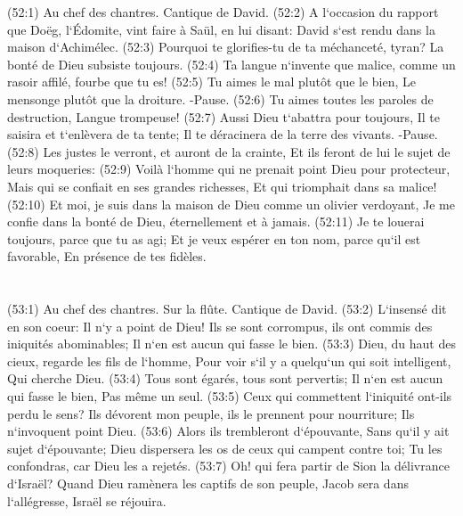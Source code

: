 \verse (52:1) Au chef des chantres. Cantique de David. (52:2) A l`occasion du rapport que Doëg, l`Édomite, vint faire à Saül, en lui disant: David s`est rendu dans la maison d`Achimélec. (52:3) Pourquoi te glorifies-tu de ta méchanceté, tyran? La bonté de Dieu subsiste toujours. 
\verse (52:4) Ta langue n`invente que malice, comme un rasoir affilé, fourbe que tu es! 
\verse (52:5) Tu aimes le mal plutôt que le bien, Le mensonge plutôt que la droiture. -Pause. 
\verse (52:6) Tu aimes toutes les paroles de destruction, Langue trompeuse! 
\verse (52:7) Aussi Dieu t`abattra pour toujours, Il te saisira et t`enlèvera de ta tente; Il te déracinera de la terre des vivants. -Pause. 
\verse (52:8) Les justes le verront, et auront de la crainte, Et ils feront de lui le sujet de leurs moqueries: 
\verse (52:9) Voilà l`homme qui ne prenait point Dieu pour protecteur, Mais qui se confiait en ses grandes richesses, Et qui triomphait dans sa malice! 
\verse (52:10) Et moi, je suis dans la maison de Dieu comme un olivier verdoyant, Je me confie dans la bonté de Dieu, éternellement et à jamais. 
\verse (52:11) Je te louerai toujours, parce que tu as agi; Et je veux espérer en ton nom, parce qu`il est favorable, En présence de tes fidèles. 

\chapter{}

\verse (53:1) Au chef des chantres. Sur la flûte. Cantique de David. (53:2) L`insensé dit en son coeur: Il n`y a point de Dieu! Ils se sont corrompus, ils ont commis des iniquités abominables; Il n`en est aucun qui fasse le bien. 
\verse (53:3) Dieu, du haut des cieux, regarde les fils de l`homme, Pour voir s`il y a quelqu`un qui soit intelligent, Qui cherche Dieu. 
\verse (53:4) Tous sont égarés, tous sont pervertis; Il n`en est aucun qui fasse le bien, Pas même un seul. 
\verse (53:5) Ceux qui commettent l`iniquité ont-ils perdu le sens? Ils dévorent mon peuple, ils le prennent pour nourriture; Ils n`invoquent point Dieu. 
\verse (53:6) Alors ils trembleront d`épouvante, Sans qu`il y ait sujet d`épouvante; Dieu dispersera les os de ceux qui campent contre toi; Tu les confondras, car Dieu les a rejetés. 
\verse (53:7) Oh! qui fera partir de Sion la délivrance d`Israël? Quand Dieu ramènera les captifs de son peuple, Jacob sera dans l`allégresse, Israël se réjouira. 

\chapter{}

